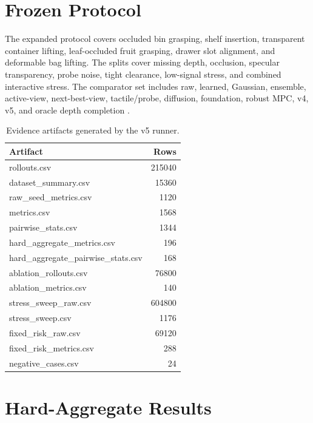 \documentclass{article}
\begin{document}
\section{Frozen Protocol}
The expanded protocol covers occluded bin grasping, shelf insertion, transparent container lifting, leaf-occluded fruit grasping, drawer slot alignment, and deformable bag lifting. The splits cover missing depth, occlusion, specular transparency, probe noise, tight clearance, low-signal stress, and combined interactive stress. The comparator set includes raw, learned, Gaussian, ensemble, active-view, next-best-view, tactile/probe, diffusion, foundation, robust MPC, v4, v5, and oracle depth completion \citep{r101109icra20157139655,r101109lra20223150045,r101109icra20136630996,r101007s1045801492798,r101007978365845699321,r101038s4159802598917w,r103390s23249700,r101038s41598024768004,r101126sciroboticsadd5139,r250710776v1}.


\begin{table}[t]
\centering
\small
\begin{tabular}{lr}
\toprule
Artifact & Rows \\
\midrule
rollouts.csv & 215040 \\
dataset\_summary.csv & 15360 \\
raw\_seed\_metrics.csv & 1120 \\
metrics.csv & 1568 \\
pairwise\_stats.csv & 1344 \\
hard\_aggregate\_metrics.csv & 196 \\
hard\_aggregate\_pairwise\_stats.csv & 168 \\
ablation\_rollouts.csv & 76800 \\
ablation\_metrics.csv & 140 \\
stress\_sweep\_raw.csv & 604800 \\
stress\_sweep.csv & 1176 \\
fixed\_risk\_raw.csv & 69120 \\
fixed\_risk\_metrics.csv & 288 \\
negative\_cases.csv & 24 \\
\bottomrule
\end{tabular}
\caption{Evidence artifacts generated by the v5 runner.}
\label{tab:rows}
\end{table}


\section{Hard-Aggregate Results}
\end{document}

